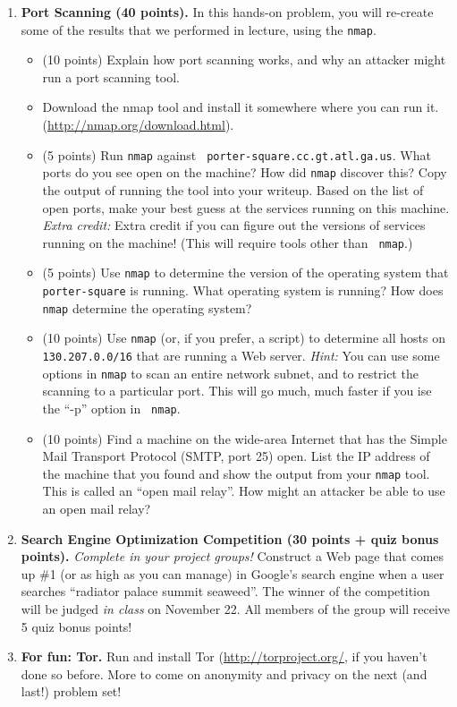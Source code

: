 \documentclass[11pt]{article}
\begin{document}
\begin{enumerate}
\newpage
\item {\bf Port Scanning (40 points).}  In this hands-on problem, you will
  re-create some of the results that we performed in lecture, using the
  {\tt nmap}.  
\begin{itemize}
\item (10 points) Explain how port scanning works, and why an attacker
  might run a port scanning tool.
\item Download the nmap tool and install it somewhere where you can run
it.  (\url{http://nmap.org/download.html}).
\item (5 points) Run {\tt nmap} against {\tt
  porter-square.cc.gt.atl.ga.us}.  What ports do you see open on the
  machine?  How did {\tt nmap} discover this? Copy the output of running
  the tool into your writeup.  Based on the list of open ports, make
  your best guess at the services running on this machine. {\em Extra
    credit:} Extra credit if you can figure out the versions of services
  running on the machine! (This will require tools other than {\tt
    nmap}.)
\item (5 points) Use {\tt nmap} to determine the version of the operating system
  that {\tt porter-square} is running.  What operating system is
  running?  How does {\tt nmap} determine the operating system?
\item (10 points) Use {\tt nmap} (or, if you prefer, a script) to determine
  all hosts on {\tt 130.207.0.0/16} that are running a Web server.  {\em
    Hint:} You can use some options in {\tt nmap} to scan an entire
  network subnet, and to restrict the scanning to a particular port.
  This will go much, much faster if you ise the ``-p'' option in {\tt
    nmap}. 
\item (10 points) Find a machine on the wide-area Internet that has
  the Simple Mail Transport Protocol (SMTP, port 25) open.  List the IP
  address of the machine that you found and show the output from your
  {\tt nmap} tool. This is called an ``open mail relay''. How might an
  attacker be able to use an open mail relay?
\end{itemize}

\item {\bf Search Engine Optimization Competition (30 points + quiz
  bonus points).}  {\em Complete in your project groups!} Construct a
  Web page that comes up \#1 (or as high as you can manage) in Google's
  search engine when a user searches ``radiator palace summit seaweed''.
  The winner of the competition will be judged {\em in class} on
  November 22.  All members of the group will receive 5 quiz bonus
  points!

\item {\bf For fun: Tor.}  Run and install Tor
  (\url{http://torproject.org/}, if you haven't done so before. More to
  come on anonymity and privacy on the next (and last!) problem set!

\end{enumerate}
\end{document}
